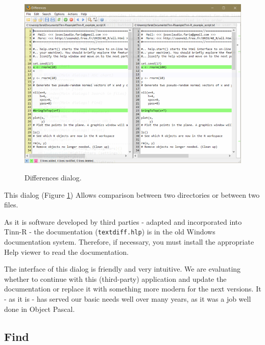 \begin{figure}[H]
  \includegraphics[scale=0.50]{./res/dlg_differences.png} \\
  \caption{Differences dialog.}
  \label{fig:dlg_differences}
\end{figure}
This dialog
(Figure \ref{fig:dlg_differences})
Allows comparison between two directories or between two files.

As it is software developed by third parties - adapted and incorporated into Tinn-R - the documentation
(\texttt{textdiff.hlp}) is in the old Windows documentation system. Therefore, if necessary, you must
install the appropriate Help viewer to read the documentation.

The interface of this dialog is friendly and very intuitive. We are evaluating whether to continue with
this (third-party) application and update the documentation or replace it with something more modern
for the next versions. It - as it is - has served our basic needs well over many years, as it was a
job well done in Object Pascal.


\hypertarget{dlg_find}{}
\subsection{Find}

